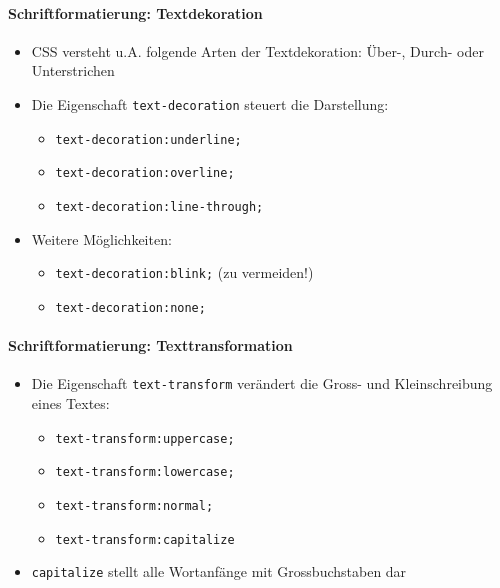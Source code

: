 \documentclass[10pt,a4paper]{article}
\begin{document}
\paragraph{Schriftformatierung: Textdekoration}
\begin{itemize}[noitemsep,topsep=0pt,leftmargin=*]
    \item CSS versteht u.A. folgende Arten der Textdekoration: Über-, Durch- oder Unterstrichen
    \item Die Eigenschaft \texttt{text-decoration} steuert die Darstellung:
    \begin{itemize}[noitemsep,topsep=0pt,leftmargin=*]
        \item \texttt{text-decoration:underline;}
        \item \texttt{text-decoration:overline;}
        \item \texttt{text-decoration:line-through;}
    \end{itemize}
    \item Weitere Möglichkeiten:
    \begin{itemize}[noitemsep,topsep=0pt,leftmargin=*]
        \item \texttt{text-decoration:blink;} (zu vermeiden!)
        \item \texttt{text-decoration:none;}
    \end{itemize}
\end{itemize}

\paragraph{Schriftformatierung: Texttransformation}
\begin{itemize}[noitemsep,topsep=0pt,leftmargin=*]
    \item Die Eigenschaft \texttt{text-transform} verändert die Gross- und Kleinschreibung eines Textes:
    \begin{itemize}[noitemsep,topsep=0pt,leftmargin=*]
        \item \texttt{text-transform:uppercase;}
        \item \texttt{text-transform:lowercase;}
        \item \texttt{text-transform:normal;}
        \item \texttt{text-transform:capitalize}
    \end{itemize}
    \item \texttt{capitalize} stellt alle Wortanfänge mit Grossbuchstaben dar
\end{itemize}
\end{document}
